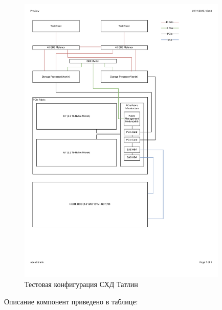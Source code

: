 \begin{figure}[H]
\centering
\includegraphics[width=10cm]{Kenenbek/images/tatlin-setup.pdf}
\caption{Тестовая конфигурация СХД Татлин}
\label{fig:tatlin-setup}
\end{figure}

Описание компонент приведено в таблице:

